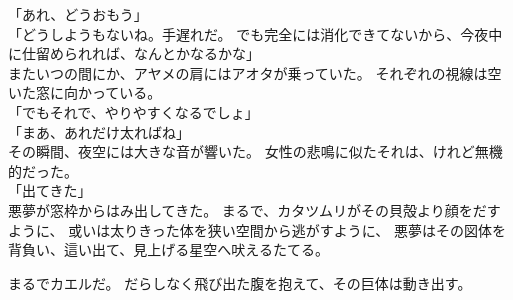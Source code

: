 \documentclass[../IHMain]{subfiles}
\begin{document}
「あれ、どうおもう」\\
「どうしようもないね。手遅れだ。
でも完全には消化できてないから、今夜中に仕留められれば、なんとかなるかな」\\
またいつの間にか、アヤメの肩にはアオタが乗っていた。
それぞれの視線は空いた窓に向かっている。\\
「でもそれで、やりやすくなるでしょ」\\
「まあ、あれだけ太ればね」\\
その瞬間、夜空には大きな音が響いた。
女性の悲鳴に似たそれは、けれど無機的だった。\\
「出てきた」\\
悪夢が窓枠からはみ出してきた。
まるで、カタツムリがその貝殻より顔をだすように、
或いは太りきった体を狭い空間から逃がすように、
悪夢はその図体を背負い、這い出て、見上げる星空へ吠えるたてる。

まるでカエルだ。
だらしなく飛び出た腹を抱えて、その巨体は動き出す。
\end{document}
